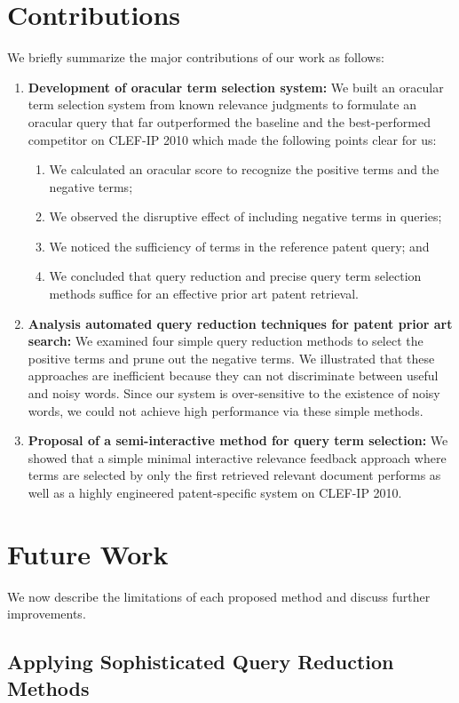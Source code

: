 \section{Contributions}
\label{sec:contributions}
We briefly summarize the major contributions of our work as follows:
\begin{enumerate}
\item \textbf{Development of oracular term selection system: }We built an oracular term selection system from known relevance judgments to formulate an oracular query that far outperformed the baseline and the best-performed competitor on CLEF-IP 2010 which made the following points clear for us:
\begin{enumerate}
\item We calculated an oracular score to recognize the positive terms and the negative terms;
\item We observed the disruptive effect of including negative terms in queries;
\item We noticed the sufficiency of terms in the reference patent query; and 
\item We concluded that query reduction and precise query term selection methods suffice for an effective prior art patent retrieval.
\end{enumerate}
\item \textbf{Analysis automated query reduction techniques for patent prior art search: } We examined four simple query reduction methods to select the positive terms and prune out the negative terms. We illustrated that these approaches are inefficient because they can not discriminate between useful and noisy words. Since our system is over-sensitive to the existence of noisy words, we could not achieve high performance via these simple methods. 
\item \textbf{Proposal of a semi-interactive method for query term selection: }We showed that a simple minimal interactive relevance feedback approach where terms are selected by only the first retrieved relevant document performs as well as a highly engineered patent-specific system on CLEF-IP 2010. 
\end{enumerate}

\section{Future Work}
\label{sec:future}
We now describe the limitations of each proposed method and discuss further
improvements.
\subsection{Applying Sophisticated Query Reduction Methods}
\label{subsec:SophisticatedQueryReduction}


